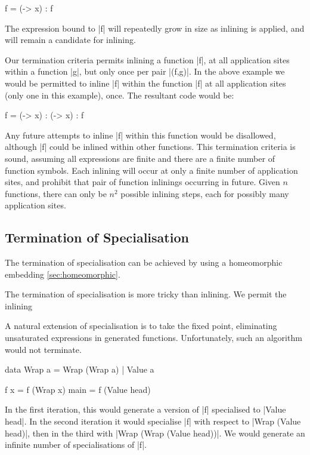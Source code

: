 \documentclass[preprint]{sigplanconf}
\begin{document}
\begin{example}
\begin{code}
f = (\x -> x) : f
\end{code}

The expression bound to |f| will repeatedly grow in size as inlining is applied, and will remain a candidate for inlining.
\end{example}

Our termination criteria permits inlining a function |f|, at all application sites within a function |g|, but only once per pair |(f,g)|. In the above example we would be permitted to inline |f| within the function |f| at all application sites (only one in this example), once. The resultant code would be:

\begin{code}
f = (\x -> x) : (\x -> x) : f
\end{code}

Any future attempts to inline |f| within this function would be disallowed, although |f| could be inlined within other functions. This termination criteria is sound, assuming all expressions are finite and there are a finite number of function symbols. Each inlining will occur at only a finite number of application sites, and prohibit that pair of function inlinings occurring in future. Given $n$ functions, there can only be $n^2$ possible inlining steps, each for possibly many application sites.


\subsection{Termination of Specialisation}

The termination of specialisation can be achieved by using a homeomorphic embedding \ref{sec:homeomorphic}.

The termination of specialisation is more tricky than inlining. We permit the inlining

A natural extension of specialisation is to take the fixed point, eliminating unsaturated expressions in generated functions. Unfortunately, such an algorithm would not terminate.

\begin{example}
\begin{code}
data Wrap a  =  Wrap (Wrap a)
             |  Value a

f x = f (Wrap x)
main = f (Value head)
\end{code}

In the first iteration, this would generate a version of |f| specialised to |Value head|. In the second iteration it would specialise |f| with respect to |Wrap (Value head)|, then in the third with |Wrap (Wrap (Value head))|. We would generate an infinite number of specialisations of |f|.
\end{example}
\end{document}
